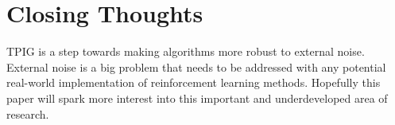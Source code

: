 \documentclass[12pt]{thesis}
\begin{document}
\section{Closing Thoughts}
TPIG is a step towards making algorithms more robust to external noise. External noise is a big problem that needs to be addressed with any potential real-world implementation of reinforcement learning methods. Hopefully this paper will spark more interest into this important and underdeveloped area of research.


%
%
%
%
%
\end{document}
